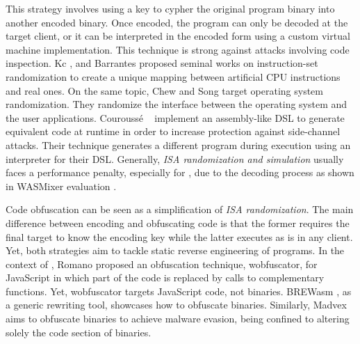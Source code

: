 \begin{strategy}
    \label{isa_rand}

    This strategy involves using a key to cypher the original program binary into another encoded binary. 
    Once encoded, the program can only be decoded at the target client, or it can be interpreted in the encoded form using a custom virtual machine implementation. 
    This technique is strong against attacks involving code inspection. 
    Kc \etal \cite{Kc03}, and Barrantes \etal \cite{barrantes2003randomized} proposed seminal works on instruction-set randomization 
    to create a unique mapping between artificial CPU instructions and real ones.
    On the same topic, Chew and Song \cite{Chew02mitigatingbuffer} target operating system randomization. They randomize the interface between the operating system and the user applications.
    Courouss{\'e} \etal~\cite{courousse2016runtime} implement an assembly-like DSL to generate equivalent code at runtime in order to increase protection against side-channel attacks. 
    Their technique generates a different program during execution using an interpreter for their DSL.
    Generally, \emph{ISA randomization and simulation} usually faces a performance penalty, especially for \Wasm, due to the decoding process as shown in WASMixer evaluation \cite{wasmixer}.
\end{strategy}


\begin{strategy}
    \label{obfusscation}
    Code obfuscation can be seen as a simplification of \emph{ISA randomization}. 
    The main difference between encoding and obfuscating code is that the former requires the final target to know the encoding key while the latter executes as is in any client. 
    Yet, both strategies aim to tackle static reverse engineering of programs.
    In the context of \Wasm, Romano \etal \cite{wobfuscator} proposed an obfuscation technique, wobfuscator, for JavaScript in which part of the code is replaced by calls to complementary \Wasm functions.
    Yet, wobfuscator targets JavaScript code, not \Wasm binaries.
    BREWasm \cite{BREWasm}, as a generic rewriting tool, showcases how to obfuscate \Wasm binaries. 
    Similarly, Madvex \cite{madvex} aims to obfuscate \Wasm binaries to achieve malware evasion, being confined to altering solely the code section of \Wasm binaries. 
\end{strategy}



